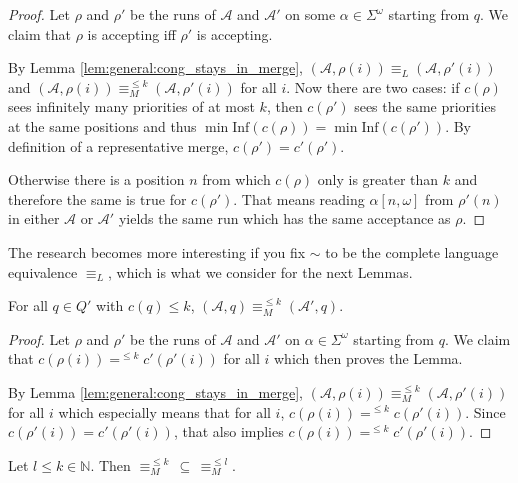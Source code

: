 \begin{proof} 
	Let $\rho$ and $\rho'$ be the runs of $\mathcal{A}$ and $\mathcal{A}'$ on some $\alpha \in \Sigma^\omega$ starting from $q$. We claim that $\rho$ is accepting iff $\rho'$ is accepting.
	
	By Lemma \ref{lem:general:cong_stays_in_merge}, $(\mathcal{A}, \rho(i)) \equiv_L (\mathcal{A}, \rho'(i))$ and $(\mathcal{A}, \rho(i)) \equiv_M^{\leq k} (\mathcal{A}, \rho'(i))$ for all $i$. Now there are two cases: if $c(\rho)$ sees infinitely many priorities of at most $k$, then $c(\rho')$ sees the same priorities at the same positions and thus $\min \text{Inf}(c(\rho)) = \min \text{Inf}(c(\rho'))$. By definition of a representative merge, $c(\rho') = c'(\rho')$.
	
	 Otherwise there is a position $n$ from which $c(\rho)$ only is greater than $k$ and therefore the same is true for $c(\rho')$. That means reading $\alpha[n,\omega]$ from $\rho'(n)$ in either $\mathcal{A}$ or $\mathcal{A}'$ yields the same run which has the same acceptance as $\rho$.
\end{proof}

\vspace{10pt}

The research becomes more interesting if you fix $\sim$ to be the complete language equivalence $\equiv_L$, which is what we consider for the next Lemmas.

\begin{lem}
	For all $q \in Q'$ with $c(q) \leq k$, $(\mathcal{A}, q) \equiv_M^{\leq k} (\mathcal{A}', q)$.
	\label{lem:tremoore:merge_keep_tmoore}
\end{lem}

\begin{proof} 
	Let $\rho$ and $\rho'$ be the runs of $\mathcal{A}$ and $\mathcal{A}'$ on $\alpha \in \Sigma^\omega$ starting from $q$. We claim that $c(\rho(i)) =^{\leq k} c'(\rho'(i))$ for all $i$ which then proves the Lemma.
	
	By Lemma \ref{lem:general:cong_stays_in_merge}, $(\mathcal{A}, \rho(i)) \equiv_M^{\leq k} (\mathcal{A}, \rho'(i))$ for all $i$ which especially means that for all $i$, $c(\rho(i)) =^{\leq k} c(\rho'(i))$. Since $c(\rho'(i)) = c'(\rho'(i))$, that also implies $c(\rho(i)) =^{\leq k} c'(\rho'(i))$.
\end{proof}

\begin{lem}
	Let $l \leq k \in \mathbb{N}$. Then $\equiv_M^{\leq k} \,\subseteq\, \equiv_M^{\leq l}$.
	\label{lem:tremoore:moore_less_thresh_is_subset}
\end{lem}

